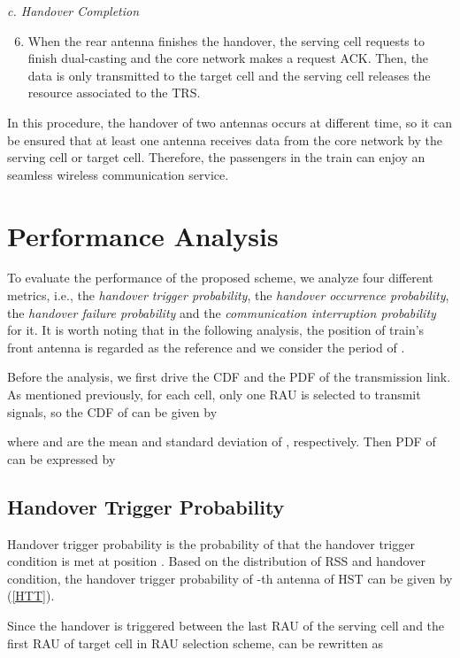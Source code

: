 \documentclass[a4paper,twocolumn,10pt]{IEEEtran}
\begin{document}
\emph{c. Handover Completion}

\begin{enumerate}
\setcounter{enumi}{5}
\item When the rear antenna finishes the handover, the serving cell requests to finish dual-casting and the core network makes a request ACK. Then, the data is only transmitted to the target cell and the serving cell releases the resource associated to the TRS.
\end{enumerate}

In this procedure, the handover of two antennas occurs at different time, so it can be ensured that at least one antenna receives data from the core network by the serving cell or target cell. Therefore, the passengers in the train can enjoy an seamless wireless communication service.


\section{Performance Analysis}

To evaluate the performance of the proposed scheme, we analyze four different metrics, i.e., the \textit{handover trigger probability}, the \textit{handover occurrence probability}, the \textit{handover failure probability} and the \textit{communication interruption probability} for it. It is worth noting that in the following analysis, the position of train's front antenna  is regarded as the reference and we consider the period of .

Before the analysis, we first drive the CDF and the PDF of the transmission link. As mentioned previously, for each cell, only one RAU is selected to transmit signals, so
the CDF of  can be given by

where  and  are the mean and standard deviation of , respectively. Then PDF of  can be expressed by


\subsection{Handover Trigger Probability}
Handover trigger probability is the probability of that the handover trigger condition is met at position . Based on the distribution of RSS and handover condition, the handover trigger probability of -th antenna of HST can be given by (\ref{HTT}).


Since the handover is triggered between the last RAU of the serving cell and the first RAU of target cell in RAU selection scheme,  can be rewritten as
\end{document}
